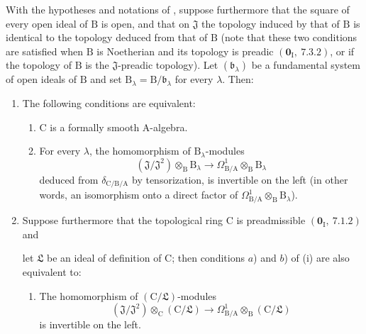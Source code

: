 \begin{corollary}[22.6.2]
\label{0.22.6.2}
With the hypotheses and notations of , suppose furthermore
that the square of every open ideal of $\mathrm{B}$ is open, and that on
$\mathfrak{J}$ the topology induced by that of $\mathrm{B}$ is identical to
the topology deduced from that of $\mathrm{B}$  (note that these
two conditions are satisfied when $\mathrm{B}$ is Noetherian and its topology
is preadic $(\mathbf{0}_\mathrm{I},~7.3.2)$, or if the topology of $\mathrm{B}$
is the $\mathfrak{J}$-preadic topology). Let $(\mathfrak{b}_\lambda)$ be a
fundamental system of open ideals of $\mathrm{B}$ and set
$\mathrm{B}_\lambda=\mathrm{B}/\mathfrak{b}_\lambda$ for every $\lambda$.
Then:
\begin{enumerate}
  \item[\rm{(i)}] The following conditions are equivalent:
  \begin{enumerate}
    \item[a)] $\mathrm{C}$ is a formally smooth $\mathrm{A}$-algebra.
    \item[b)] For every $\lambda$, the homomorphism of
    $\mathrm{B}_\lambda$-modules
    \[
    \label{0.22.6.2.1}
      (\mathfrak{J}/\mathfrak{J}^2)\otimes_\mathrm{B}\mathrm{B}_\lambda
      \longrightarrow
      \Omega^1_{\mathrm{B}/\mathrm{A}}\otimes_\mathrm{B}\mathrm{B}_\lambda
      \tag{22.6.2.1}
    \]
    deduced from $\delta_{\mathrm{C}/\mathrm{B}/\mathrm{A}}$ by tensorization,
    is invertible on the left (in other words, an isomorphism onto a direct
    factor of
    $\Omega^1_{\mathrm{B}/\mathrm{A}}\otimes_\mathrm{B}\mathrm{B}_\lambda$).
  \end{enumerate}
  \item[\rm{(ii)}] Suppose furthermore that the topological ring $\mathrm{C}$
  is preadmissible $(\mathbf{0}_\mathrm{I},~7.1.2)$ and


  let $\mathfrak{L}$ be an ideal of definition of $\mathrm{C}$; then
  conditions $a$) and $b$) of (i) are also equivalent to:
  \begin{enumerate}
    \item[c)] The homomorphism of $(\mathrm{C}/\mathfrak{L})$-modules
    \[
      (\mathfrak{J}/\mathfrak{J}^2)\otimes_\mathrm{C}
      (\mathrm{C}/\mathfrak{L})\longrightarrow
      \Omega^1_{\mathrm{B}/\mathrm{A}}\otimes_\mathrm{B}
      (\mathrm{C}/\mathfrak{L})
    \]
    is invertible on the left.
  \end{enumerate}
\end{enumerate}
\end{corollary}

